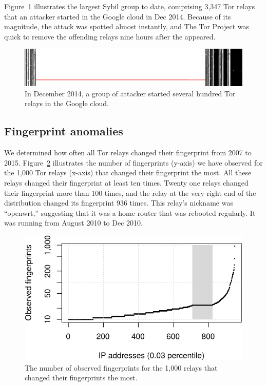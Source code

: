Figure~\ref{fig:2014-12-lizard} illustrates the largest Sybil group to date,
comprising 3,347 Tor relays that an attacker started in the Google cloud in
Dec 2014.  Because of its magnitude, the attack was spotted almost
instantly, and The Tor Project was quick to remove the offending relays nine
hours after the appeared.

\begin{figure}[t]
	\centering
	\includegraphics[width=\linewidth]{diagrams/2014-12.jpg}
	\caption{In December 2014, a group of attacker started several hundred Tor
		relays in the Google cloud.}
	\label{fig:2014-12-lizard}
\end{figure}

\subsection{Fingerprint anomalies}
\label{sec:fingerprint-anomalies}
We determined how often all Tor relays changed their fingerprint from 2007 to
2015.  Figure~\ref{fig:fingerprints} illustrates the number of fingerprints
(y-axis) we have observed for the 1,000 Tor relays (x-axis) that changed their
fingerprint the most.  All these relays changed their fingerprint at least ten
times.  Twenty one relays changed their fingerprint more than 100 times, and the
relay at the very right end of the distribution changed its fingerprint 936
times.  This relay's nickname was ``openwrt,'' suggesting that it was a home
router that was rebooted regularly.  It was running from August 2010 to Dec
2010.

\begin{figure}[t]
	\centering
	\includegraphics[width=0.8\linewidth]{diagrams/fingerprints.pdf}
	\caption{The number of observed fingerprints for the 1,000 relays that
	changed their fingerprints the most.}
	\label{fig:fingerprints}
\end{figure}

